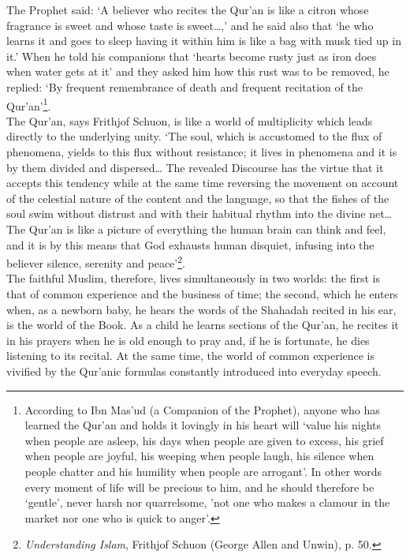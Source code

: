 \documentclass[10pt, twoside,openright]{book}
\begin{document}
The Prophet said: `A believer who recites the Qur'an is like a citron whose fragrance is sweet and 
whose taste is sweet\ldots{},' and he said also that `he who learns it and goes to sleep having it within 
him is like a bag with musk tied up in it.' When he told his companions that `hearts become rusty 
just as iron does when water gets at it' and they asked him how this rust was to be removed, he 
replied: `By frequent remembrance of death and frequent recitation of the Qur'an'\footnote{According to Ibn Mas'ud (a Companion of the Prophet), anyone who has learned the Qur'an and holds 
it lovingly in his heart will `value his nights when people are asleep, his days when people are 
given to excess, his grief when people are joyful, his weeping when people laugh, his silence when 
people chatter and his humility when people are arrogant'. In other words every moment of life will 
be precious to him, and he should therefore be `gentle', never harsh nor quarrelsome, 'not one who 
makes a clamour in the market nor one who is quick to anger'.}.\\

The Qur'an, says Frithjof Schuon, is like a world of multiplicity which leads directly to the 
underlying unity. `The soul, which is accustomed to the flux of phenomena, yields to this flux 
without resistance; it lives in phenomena and it is by them divided and dispersed\ldots{} The revealed 
Discourse has the virtue that it accepts this tendency while at the same time reversing the movement 
on account of the celestial nature of the content and the language, so that the fishes of the soul 
swim without distrust and with their habitual rhythm into the divine net\ldots{} The Qur'an is like a 
picture of everything the human brain can think and feel, and it is by this means that God exhausts 
human disquiet, infusing into the believer silence, serenity and peace'\footnote{\emph{Understanding Islam}, Frithjof Schuon (George Allen and Unwin), p. 50.}.\\

The faithful Muslim, therefore, lives simultaneously in two worlds: the first is that of common 
experience and the business of time; the second, which he enters when, as a newborn baby, he hears 
the words of the Shahadah recited in his ear, is the world of the Book. As a child he learns sections 
of the Qur'an, he recites it in his prayers when he is old enough to pray and, if he is fortunate, he 
dies listening to its recital. At the same time, the world of common experience is vivified by the 
Qur'anic formulas constantly introduced into everyday speech. \\
\end{document}

